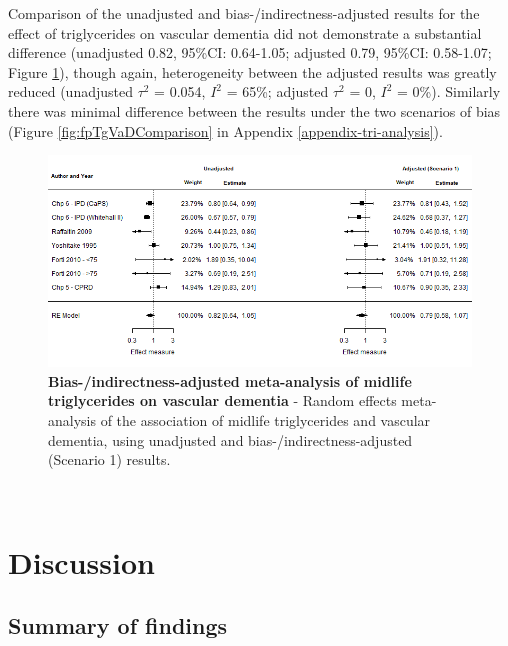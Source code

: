 \documentclass[a4paper, twoside]{templates/ociamthesis}
\begin{document}
Comparison of the unadjusted and bias-/indirectness-adjusted results for the effect of triglycerides on vascular dementia did not demonstrate a substantial difference (unadjusted 0.82, 95\%CI: 0.64-1.05; adjusted 0.79, 95\%CI: 0.58-1.07; Figure \ref{fig:fpTgVad}), though again, heterogeneity between the adjusted results was greatly reduced (unadjusted \(\tau^2\) = 0.054, \(I^2\) = 65\%; adjusted \(\tau^2\) = 0, \(I^2\) = 0\%). Similarly there was minimal difference between the results under the two scenarios of bias (Figure \ref{fig:fpTgVaDComparison} in Appendix \ref{appendix-tri-analysis}).





\begin{figure}[H]
\includegraphics[width=1\linewidth]{figures/tri/fp_paired_midlife_tg_vad} \caption[Bias-/indirectness-adjusted meta-analysis of midlife triglycerides on vascular dementia]{\textbf{Bias-/indirectness-adjusted meta-analysis of midlife triglycerides on vascular dementia} - Random effects meta-analysis of the association of midlife triglycerides and vascular dementia, using unadjusted and bias-/indirectness-adjusted (Scenario 1) results.}\label{fig:fpTgVad}
\end{figure}

~

\hypertarget{discussion-4}{%
\section{Discussion}\label{discussion-4}}

\hypertarget{summary-of-findings-3}{%
\subsection{Summary of findings}\label{summary-of-findings-3}}
\end{document}
